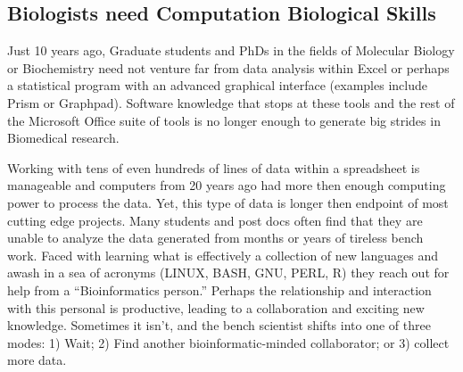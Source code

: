 

  \subsection{Biologists need Computation Biological Skills}

    Just 10 years ago,  Graduate students and PhDs in the fields of Molecular Biology or Biochemistry need not venture far from data analysis within Excel or perhaps a statistical program with an advanced graphical interface (examples include Prism or Graphpad). Software knowledge that stops at these tools and the rest of the Microsoft Office suite of tools is no longer enough to generate big strides in Biomedical research.

    Working with tens of even hundreds of lines of data within a spreadsheet is manageable and computers from 20 years ago had more then enough computing power to process the data. Yet, this type of data is longer then endpoint of most cutting edge projects. Many students and post docs often find that they are unable to analyze the data generated from months or years of tireless bench work. Faced with learning what is effectively a collection of new languages and awash in a sea of acronyms (LINUX, BASH, GNU, PERL, R) they reach out for help from a ``Bioinformatics person.'' Perhaps the relationship and interaction with this personal is productive, leading to a collaboration and exciting new knowledge. Sometimes it isn't, and the bench scientist shifts into one of three modes: 1) Wait; 2) Find another bioinformatic-minded collaborator; or 3) collect more data.

